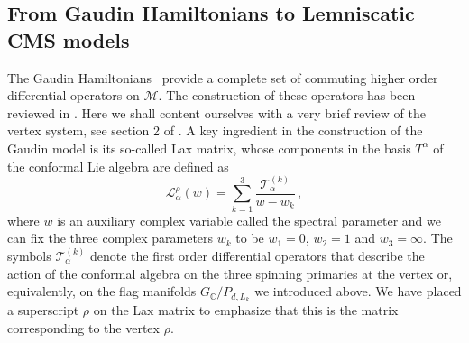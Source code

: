 \documentclass{article}
\def\Lc{\mathcal{L}}
\def\bC{\mathbb{C}}
\begin{document}
\subsection{From Gaudin Hamiltonians to Lemniscatic CMS models} 

The Gaudin Hamiltonians~\cite{Gaudin_76a,Gaudin_book83,Feigin:1994in} provide a complete set of commuting higher order 
differential operators on $\mathcal{M}$. The construction of these operators 
has been reviewed in \cite{Buric:2020dyz,Buric:2021ywo}. Here we shall content 
ourselves with a very brief review of the vertex system, see section 2 of 
\cite{Buric:2021ywo}. A key ingredient in the construction of the Gaudin 
model is its so-called Lax matrix, whose components in the basis 
$T^\alpha$ of the conformal Lie algebra are defined as
\begin{equation}\label{eq:Lax3pt}
\Lc^\rho_\alpha(w) = \sum_{k=1}^3 \frac{\mathcal{T}_\alpha^{(k)}}{w-w_k}\,,
\end{equation}
where $w$ is an auxiliary complex variable called the spectral parameter and 
we can fix the three complex parameters $w_k$ to be $w_1 = 0$, $w_2 = 1$ and 
$w_3 = \infty$. The symbols $\mathcal{T}_\alpha^{(k)}$ denote the first order differential 
operators that describe the action of the conformal algebra on the three spinning
primaries at the vertex or, equivalently, on the flag manifolds $G_{\bC}/P_{d,L_k}$
we introduced above. We have placed a superscript $\rho$ on the Lax matrix 
to emphasize that this is the matrix corresponding to the vertex $\rho$. 
\end{document}
